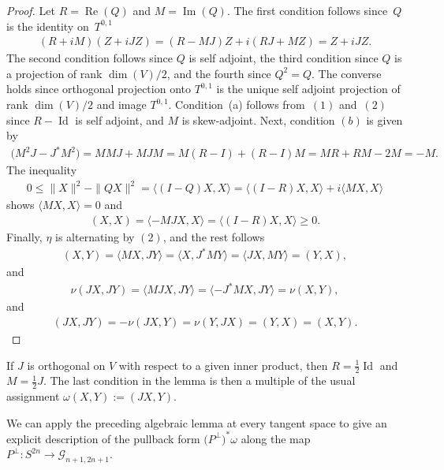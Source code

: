 \documentclass[pdftex]{sigma}
\numberwithin{equation}{section}
\newcommand{\cG}{{\mathcal G}}
\begin{document}
\begin{proof} Let $R = \operatorname{Re}(Q)$ and $M = \operatorname{Im}(Q)$. The first condition follows since~$Q$ is the identity on~$T^{0,1}$
\begin{gather*}
(R+iM)(Z+iJZ) = (R-MJ)Z + i(RJ+MZ) = Z+iJZ.
\end{gather*}
The second condition follows since $Q$ is self adjoint, the third condition since $Q$ is a projection of rank $\dim(V)/2$, and the fourth since $Q^2 = Q$. The converse holds since orthogonal projection onto $T^{0,1}$ is the unique self adjoint projection of rank $\dim(V)/2$ and image $T^{0,1}$. Condition~(a) follows from~$(1)$ and~$(2)$ since $R-\operatorname{Id}$ is self adjoint, and $M$ is skew-adjoint. Next, condition $(b)$ is given by
\begin{gather*}
\big(M^2J-J^*M^2) = MMJ+MJM = M(R-I)+(R-I)M = MR+RM-2M = -M.
\end{gather*}
The inequality
\begin{gather*}
0 \leq \|X\|^2 - \|Q X\|^2 = \langle (I-Q)X, X \rangle = \langle (I-R)X, X \rangle + i \langle MX , X\rangle
\end{gather*}
shows $\langle MX , X\rangle =0$ and
\begin{gather*}
 (X,X) = \langle -MJ X, X \rangle = \langle (I-R)X, X \rangle \geq 0.
\end{gather*}
Finally, $\eta$ is alternating by $(2)$, and the rest follows
\begin{gather*}
(X,Y) = \langle M X, JY\rangle = \langle X, J^*M Y\rangle = \langle JX, MY\rangle = (Y,X),
\end{gather*}
and
\begin{gather*}
 \nu(JX,JY) = \langle M JX, JY\rangle = \langle - J^* M X, JY\rangle = \nu(X,Y) ,
\end{gather*}
and
\begin{gather*}
(JX,JY) = -\nu(JX,Y)= \nu(Y,JX)= (Y,X) = (X,Y).\tag*{\qed}
 \end{gather*}
 \renewcommand{\qed}{}
\end{proof}

\begin{ex} \label{ex;MonehalfJ} If $J$ is orthogonal on $V$ with respect to a given inner product, then $R= \frac 1 2 \operatorname{Id} $ and $M = \frac 1 2 J$. The last condition in the lemma is then a multiple of the usual assignment $\omega(X,Y) := (J X,Y)$.
 \end{ex}

We can apply the preceding algebraic lemma at every tangent space to give an explicit description of the pullback form $\big(P^\perp\big)^*\omega$ along the map $P^\perp\colon S^{2n} \to \cG_{n+1,2n+1}$.
\end{document}
